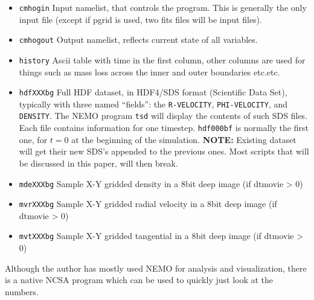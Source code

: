 \documentclass[10pt,dvips]{article}
\begin{document}
\begin{itemize}

\item
{\tt cmhogin}
Input namelist, that controls the program. This is generally
the only input file (except if pgrid is used, two fits files
will be input files).

\item
{\tt cmhogout}
Output namelist, reflects current state of all variables.

\item
{\tt history}
Ascii table with time in the first column, other columns 
are used for things such as mass loss across the inner and 
outer boundaries etc.etc.

\item
{\tt hdfXXXbg}
Full HDF dataset, in HDF4/SDS format (Scientific Data Set), typically
with three named ``fields'': the 
{\tt R-VELOCITY}, {\tt PHI-VELOCITY}, and {\tt DENSITY}.
The NEMO program {\tt tsd} will display the contents of
such SDS files. Each file contains information for one timestep.
{\tt hdf000bf} is normally the first one, for $t=0$ at the beginning
of the simulation.
\newline
{\bf NOTE:} Existing dataset will get their new SDS's appended to
the previous ones. Most scripts that will be discussed in this
paper, will then break. 

\item
{\tt mdeXXXbg}
Sample X-Y gridded density in a 8bit deep image (if dtmovie > 0)

\item
{\tt mvrXXXbg}
Sample X-Y gridded radial velocity in a 8bit deep image (if dtmovie > 0)

\item
{\tt mvtXXXbg}
Sample X-Y gridded tangential in a 8bit deep image (if dtmovie > 0)

\end{itemize}

Although the author has mostly used NEMO for analysis and visualization, 
there is a native NCSA program which can be used to quickly just look
at the numbers.
\end{document}
